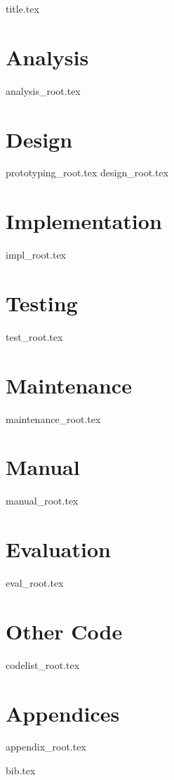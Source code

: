\documentclass[a4paper, 12pt]{scrartcl}
\begin{document}
{title.tex}

\begin{footnotesize}
\tableofcontents
\end{footnotesize}

\pagebreak

\section{Analysis}
{analysis_root.tex}
\pagebreak

\section{Design}
{prototyping_root.tex}
{design_root.tex}
\pagebreak

\section{Implementation}
{impl_root.tex}
\pagebreak

\section{Testing}
{test_root.tex}
\pagebreak

\section{Maintenance}
{maintenance_root.tex}
\pagebreak

\section{Manual}
{manual_root.tex}
\pagebreak

\section{Evaluation}
{eval_root.tex}
\pagebreak

\section{Other Code}
{codelist_root.tex}
\pagebreak

\appendix
\section*{Appendices}
\renewcommand{\thesubsection}{\Alph{subsection}}
{appendix_root.tex}
\pagebreak

{bib.tex}
\end{document}
